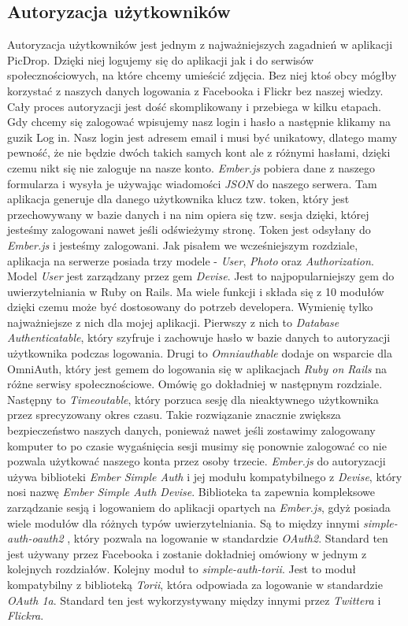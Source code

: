 \documentclass[brudnopis]{xmgr}
\begin{document}
\subsection{Autoryzacja użytkowników}
Autoryzacja użytkowników jest jednym z najważniejszych zagadnień w aplikacji PicDrop. Dzięki niej logujemy się do aplikacji jak i do serwisów społecznościowych, na które chcemy umieścić zdjęcia. Bez niej ktoś obcy mógłby korzystać z naszych danych logowania z Facebooka i Flickr bez naszej wiedzy. Cały proces autoryzacji jest dość skomplikowany i przebiega w kilku etapach. Gdy chcemy się zalogować wpisujemy nasz login i hasło a następnie klikamy na guzik Log in. Nasz login jest adresem email i musi być unikatowy, dlatego mamy pewność, że nie będzie dwóch takich samych kont ale z różnymi hasłami, dzięki czemu nikt się nie zaloguje na nasze konto. \textit{Ember.js} pobiera dane z naszego formularza i wysyła je używając wiadomości \textit{JSON} do naszego serwera. Tam aplikacja generuje dla danego użytkownika klucz tzw. token, który jest przechowywany w bazie danych i na nim opiera się tzw. sesja dzięki, której jesteśmy zalogowani nawet jeśli odświeżymy stronę. Token jest odsyłany do \textit{Ember.js} i jesteśmy zalogowani. \newline \indent Jak pisałem we wcześniejszym rozdziale, aplikacja na serwerze posiada  trzy modele - \textit{User}, \textit{Photo} oraz \textit{Authorization}. Model \textit{User} jest zarządzany przez gem \textit{Devise}. Jest to najpopularniejszy gem do uwierzytelniania w Ruby on Rails. Ma wiele funkcji i składa się z 10 modułów dzięki czemu może być dostosowany do potrzeb developera. Wymienię tylko najważniejsze z nich dla mojej aplikacji. Pierwszy z nich to \textit{Database Authenticatable}, który szyfruje i zachowuje hasło w bazie danych to autoryzacji użytkownika podczas logowania. Drugi to \textit{Omniauthable} dodaje on wsparcie dla OmniAuth, który jest gemem do logowania się w aplikacjach \textit{Ruby on Rails} na różne serwisy społecznościowe. Omówię go dokładniej w następnym rozdziale. Następny to \textit{Timeoutable}, który porzuca sesję dla nieaktywnego użytkownika przez sprecyzowany okres czasu. Takie rozwiązanie znacznie zwiększa bezpieczeństwo naszych danych, ponieważ nawet jeśli zostawimy zalogowany komputer to po czasie wygaśnięcia sesji musimy się ponownie zalogować co nie pozwala użytkować naszego konta przez osoby trzecie.
\newline\indent \textit{Ember.js} do autoryzacji używa biblioteki \textit{Ember Simple Auth} i jej modułu kompatybilnego z \textit{Devise}, który nosi nazwę \textit{Ember Simple Auth Devise}. Biblioteka ta zapewnia kompleksowe zarządzanie sesją i logowaniem do aplikacji opartych na \textit{Ember.js}, gdyż posiada wiele modułów dla różnych typów uwierzytelniania. Są to między innymi \textit{simple-auth-oauth2 }, który pozwala na logowanie w standardzie \textit{OAuth2}. Standard ten jest używany przez Facebooka i zostanie dokładniej omówiony w jednym z kolejnych rozdziałów. Kolejny moduł to \textit{simple-auth-torii}. Jest to moduł kompatybilny z biblioteką \textit{Torii}, która odpowiada za logowanie w standardzie \textit{OAuth 1a}. Standard ten jest wykorzystywany między innymi przez \textit{Twittera} i \textit{Flickra}.
\end{document}
